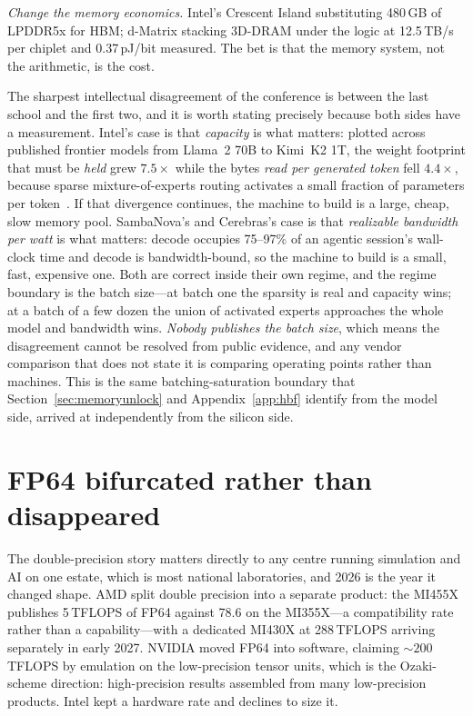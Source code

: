 \emph{Change the memory economics.} Intel's Crescent Island substituting 480\,GB of LPDDR5x for HBM; d-Matrix stacking 3D-DRAM under the logic at 12.5\,TB/s per chiplet and 0.37\,pJ/bit measured. The bet is that the memory system, not the arithmetic, is the cost.

The sharpest intellectual disagreement of the conference is between the last school and the first two, and it is worth stating precisely because both sides have a measurement. Intel's case is that \emph{capacity} is what matters: plotted across published frontier models from Llama~2 70B to Kimi~K2 1T, the weight footprint that must be \emph{held} grew $7.5\times$ while the bytes \emph{read per generated token} fell $4.4\times$, because sparse mixture-of-experts routing activates a small fraction of parameters per token~\cite{hc2026-china-bench}. If that divergence continues, the machine to build is a large, cheap, slow memory pool. SambaNova's and Cerebras's case is that \emph{realizable bandwidth per watt} is what matters: decode occupies 75--97\% of an agentic session's wall-clock time and decode is bandwidth-bound, so the machine to build is a small, fast, expensive one. Both are correct inside their own regime, and the regime boundary is the batch size---at batch one the sparsity is real and capacity wins; at a batch of a few dozen the union of activated experts approaches the whole model and bandwidth wins. \emph{Nobody publishes the batch size}, which means the disagreement cannot be resolved from public evidence, and any vendor comparison that does not state it is comparing operating points rather than machines. This is the same batching-saturation boundary that Section~\ref{sec:memoryunlock} and Appendix~\ref{app:hbf} identify from the model side, arrived at independently from the silicon side.

\section{FP64 bifurcated rather than disappeared}

The double-precision story matters directly to any centre running simulation and AI on one estate, which is most national laboratories, and 2026 is the year it changed shape. AMD split double precision into a separate product: the MI455X publishes 5\,TFLOPS of FP64 against 78.6 on the MI355X---a compatibility rate rather than a capability---with a dedicated MI430X at 288\,TFLOPS arriving separately in early 2027. NVIDIA moved FP64 into software, claiming ${\sim}200$\,TFLOPS by emulation on the low-precision tensor units, which is the Ozaki-scheme direction: high-precision results assembled from many low-precision products. Intel kept a hardware rate and declines to size it.

